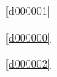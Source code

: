 ﻿



\noindent\treeindexnumbernameone\ \ref{d000001}\dotfill\pageref{d000001}%

\noindent\treeindexnumbernameone\ \ref{d000000}\dotfill\pageref{d000000}%

\noindent\treeindexnumbernameone\ \ref{d000002}\dotfill\pageref{d000002}%






